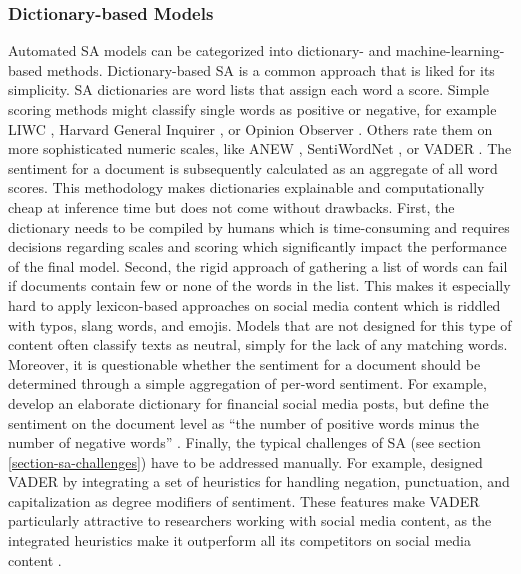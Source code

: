 \subsubsection{Dictionary-based Models}
Automated SA models can be categorized into dictionary- and machine-learning-based methods. Dictionary-based SA is a common approach that is liked for its simplicity. SA dictionaries are word lists that assign each word a score. Simple scoring methods might classify single words as positive or negative, for example LIWC , Harvard General Inquirer , or Opinion Observer . Others rate them on more sophisticated numeric scales, like ANEW , SentiWordNet , or VADER . The sentiment for a document is subsequently calculated as an aggregate of all word scores. This methodology makes dictionaries explainable and computationally cheap at inference time but does not come without drawbacks. First, the dictionary needs to be compiled by humans which is time-consuming and requires decisions regarding scales and scoring which significantly impact the performance of the final model. Second, the rigid approach of gathering a list of words can fail if documents contain few or none of the words in the list. This makes it especially hard to apply lexicon-based approaches on social media content which is riddled with typos, slang words, and emojis. Models that are not designed for this type of content often classify texts as neutral, simply for the lack of any matching words. Moreover, it is questionable whether the sentiment for a document should be determined through a simple aggregation of per-word sentiment. For example,  develop an elaborate dictionary for financial social media posts, but define the sentiment on the document level as ``the number of positive words minus the number of negative words'' \cite[p.~42]{chen2018ntusd}. Finally, the typical challenges of SA (see section \ref{section-sa-challenges}) have to be addressed manually. For example,  designed VADER by integrating a set of heuristics for handling negation, punctuation, and capitalization as degree modifiers of sentiment. These features make VADER particularly attractive to researchers working with social media content, as the integrated heuristics make it outperform all its competitors on social media content \cite{al2020evaluating}.

